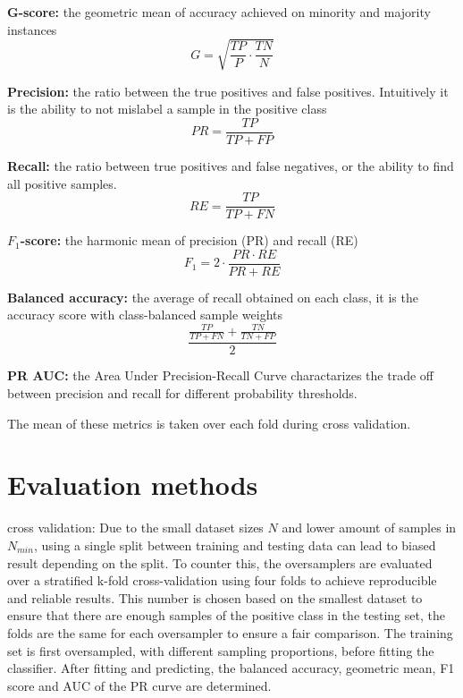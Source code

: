 \textbf{G-score:} the geometric mean of accuracy achieved on minority and majority instances
\begin{equation}
    G = \sqrt{\frac{TP}{P} \cdot \frac{TN}{N}}
\end{equation}

\textbf{Precision:} the ratio between the true positives and false positives. Intuitively it is the ability to not mislabel a sample in the positive class
\begin{equation}
    PR = \frac{TP}{TP + FP}
\end{equation}

\textbf{Recall:} the ratio between true positives and false negatives, or the ability to find all positive samples.
\begin{equation}
    RE = \frac{TP}{TP + FN}
\end{equation}

\textbf{$F_1$-score:} the harmonic mean of precision (PR) and recall (RE)
\begin{equation}
    F_1 = 2 \cdot \frac{PR \cdot RE}{PR + RE}
\end{equation}

\textbf{Balanced accuracy:} the average of recall obtained on each class, it is the accuracy score with class-balanced sample weights
\begin{equation}
    \frac{\frac{TP}{TP + FN} + \frac{TN}{TN + FP}}{2}
\end{equation}

\textbf{PR AUC:} the Area Under Precision-Recall Curve charactarizes the trade off between precision and recall for different probability thresholds. 

The mean of these metrics is taken over each fold during cross validation. 

\section{Evaluation methods}
cross validation: Due to the small dataset sizes $N$ and lower amount of samples in $N_{min}$, using a single split between training and testing data can lead to biased result depending on the split. To counter this, the oversamplers are evaluated over a stratified k-fold cross-validation using four folds to achieve reproducible and reliable results. This number is chosen based on the smallest dataset to ensure that there are enough samples of the positive class in the testing set, the folds are the same for each oversampler to ensure a fair comparison. The training set is first oversampled, with different sampling proportions, before fitting the classifier. After fitting and predicting, the balanced accuracy, geometric mean, F1 score and AUC of the PR curve are determined.